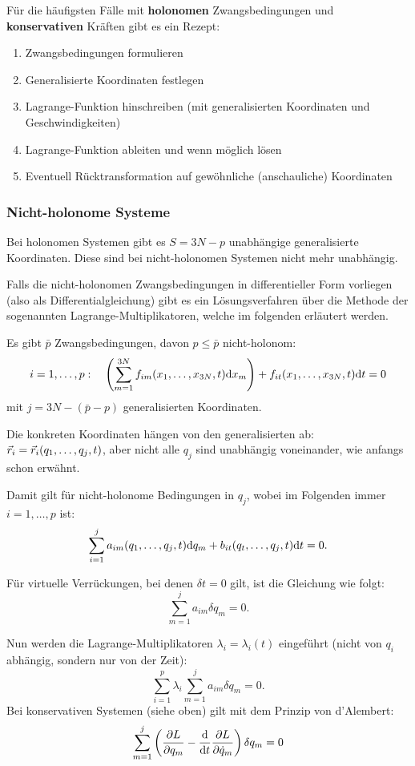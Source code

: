 Für die häufigsten Fälle mit \textbf{holonomen} Zwangsbedingungen und \textbf{konservativen} Kräften gibt es ein Rezept:
\begin{enumerate}
\item Zwangsbedingungen formulieren
\item Generalisierte Koordinaten festlegen
\item Lagrange-Funktion hinschreiben (mit generalisierten Koordinaten und Geschwindigkeiten)
\item Lagrange-Funktion ableiten und wenn möglich lösen
\item Eventuell Rücktransformation auf gewöhnliche (anschauliche) Koordinaten
\end{enumerate}

\subsubsection{Nicht-holonome Systeme}
Bei holonomen Systemen gibt es $S = 3N - p$ unabhängige generalisierte Koordinaten. Diese sind bei nicht-holonomen Systemen nicht mehr unabhängig.

Falls die nicht-holonomen Zwangsbedingungen in differentieller Form vorliegen (also als Differentialgleichung) gibt es ein Lösungsverfahren über die Methode der sogenannten Lagrange-Multiplikatoren, welche im folgenden erläutert werden.

Es gibt $\bar{p}$ Zwangsbedingungen, davon $p \leq \bar{p}$ nicht-holonom: 
\[
	i = 1, \dots, p: 
	\quad 
	\left( \sum_{m=1}^{3N} f_{im}(x_1, \dots, x_{3N}, t) \mathrm d x_m \right) + f_{it}(x_1, \dots, x_{3N}, t) \mathrm d t = 0
\]
mit $j = 3N - (\bar{p} - p)$ generalisierten Koordinaten.

Die konkreten Koordinaten hängen von den generalisierten ab: $\vec{r}_i = \vec{r}_i(q_1, \dots, q_j, t)$, aber nicht alle $q_j$ sind unabhängig voneinander, wie anfangs schon erwähnt.

Damit gilt für nicht-holonome Bedingungen in $q_j$, wobei im Folgenden immer $i = 1, \dots, p$ ist:
\[
	\sum_{i=1}^j a_{im}(q_1, \dots, q_j, t) \mathrm d q_m + b_{it}(q_t, \dots, q_j, t) \mathrm d t = 0
	\text{.}
\]

Für virtuelle Verrückungen, bei denen $\delta t = 0$ gilt, ist die Gleichung wie folgt:
\[
	\sum_{m=1}^j a_{im} \delta q_m = 0
	\text{.}
\]

Nun werden die Lagrange-Multiplikatoren $\lambda_i = \lambda_i(t)$ eingeführt (nicht von $q_i$ abhängig, sondern nur von der Zeit):
\[
	\sum_{i=1}^{p} \lambda_i \sum_{m=1}^j a_{im} \delta q_m = 0
	\text{.}
\]
Bei konservativen Systemen (siehe oben) gilt mit dem Prinzip von d'Alembert:
\[
	\sum_{m=1}^j \left( \frac{\partial L}{\partial q_m} - \frac{\mathrm d}{\mathrm d t} \frac{\partial L}{\partial \dot{q}_m} \right) \delta q_m = 0
\]

